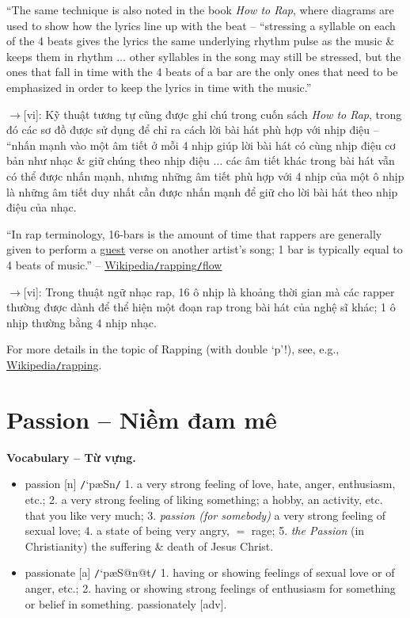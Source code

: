 \documentclass[12pt,twoside]{book}
\begin{document}
``The same technique is also noted in the book {\it How to Rap}, where diagrams are used to show how the lyrics line up with the beat -- ``stressing a syllable on each of the 4 beats gives the lyrics the same underlying rhythm pulse as the music \& keeps them in rhythm $\ldots$ other syllables in the song may still be stressed, but the ones that fall in time with the 4 beats of a bar are the only ones that need to be emphasized in order to keep the lyrics in time with the music.''

{\sf[en]$\to$[vi]}: Kỹ thuật tương tự cũng được ghi chú trong cuốn sách {\it How to Rap}, trong đó các sơ đồ được sử dụng để chỉ ra cách lời bài hát phù hợp với nhịp điệu -- ``nhấn mạnh vào một âm tiết ở mỗi 4 nhịp giúp lời bài hát có cùng nhịp điệu cơ bản như nhạc \& giữ chúng theo nhịp điệu $\ldots$ các âm tiết khác trong bài hát vẫn có thể được nhấn mạnh, nhưng những âm tiết phù hợp với 4 nhịp của một ô nhịp là những âm tiết duy nhất cần được nhấn mạnh để giữ cho lời bài hát theo nhịp điệu của nhạc.

``In rap terminology, 16-bars is the amount of time that rappers are generally given to perform a \href{https://en.wikipedia.org/wiki/Guest_appearance}{guest} verse on another artist's song; 1 bar is typically equal to 4 beats of music.'' -- \href{https://en.wikipedia.org/wiki/Rapping#Flow}{Wikipedia{\tt/}rapping{\tt/}flow}

{\sf[en]$\to$[vi]}: Trong thuật ngữ nhạc rap, 16 ô nhịp là khoảng thời gian mà các rapper thường được dành để thể hiện một đoạn rap trong bài hát của nghệ sĩ khác; 1 ô nhịp thường bằng 4 nhịp nhạc.

For more details in the topic of Rapping (with double `p'!), see, e.g., \href{https://en.wikipedia.org/wiki/Rapping}{Wikipedia{\tt/}rapping}.

\section{Passion -- Niềm đam mê}
\textbf{\textsf{\small Vocabulary -- Từ vựng.}}
\begin{itemize}\small
	\item {\sf passion} [n] {\tt/}`p\ae Sn{\tt/} 1. a very strong feeling of love, hate, anger, enthusiasm, etc.; 2. a very strong feeling of liking something; a hobby, an activity, etc. that you like very much; 3. {\it passion (for somebody)} a very strong feeling of sexual love; 4. a state of being very angry, $=$ {\sf rage}; 5. {\it the Passion} (in Christianity) the suffering \& death of {\sf Jesus Christ}.
	\item {\sf passionate} [a] {\tt/}`p\ae S@n@t{\tt/} 1. having or showing feelings of sexual love or of anger, etc.; 2. having or showing strong feelings of enthusiasm for something or belief in something. {\sf passionately} [adv].
\end{itemize}
\end{document}
